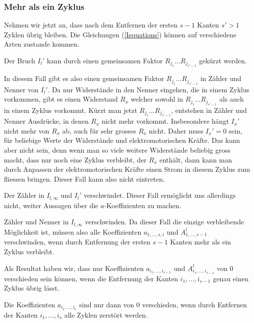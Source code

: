 \subsubsection{Mehr als ein Zyklus}
Nehmen wir jetzt an, dass nach dem Entfernen der ersten $s-1$ Kanten
$s'>1$ Zyklen übrig bleiben.
Die Gleichungen (\ref{Iequations}) können auf verschiedene Arten
zustande kommen.
\begin{compactenum}
\item Der Bruch $I_l'$ kann durch einen gemeinsamen Faktor
$R_{j_1}\dots R_{j_{s'-1}}$ gekürzt werden.

In diesem Fall gibt es also einen gemeinsamen Faktor
$R_{j_1}\dots R_{j_{s'-1}}$ in Zähler und Nenner von $I_l'$.
Da nur Widerstände in den Nenner
eingehen, die in einem Zyklus vorkommen, gibt es einen Widerstand
$R_x$ welcher sowohl in $R_{j_1}\dots R_{j_{s'-1}}$ als auch in
einem Zyklus vorkommt.
Kürzt man jetzt $R_{j_1}\dots R_{j_{s'-1}}$, entstehen in Zähler und
Nenner Ausdrücke, in denen $R_x$ nicht mehr vorkommt. 
Insbesondere hängt $I_x'$ nicht mehr von $R_x$ ab, auch für sehr grosses
$R_x$ nicht. Daher muss $I_x'=0$ sein, für beliebige Werte der Widerstände
und elektromotorischen Kräfte.
Das kann aber nicht sein, denn wenn man so viele weitere Widerstände 
beliebig gross macht, dass nur noch eine Zyklus verbleibt, der $R_x$
enthält, dann kann man durch Anpassen der elektromotorischen Kräfte
einen Strom in diesem Zyklus zum fliessen bringen. Dieser Fall kann
also nicht eintreten.
\item Der Zähler in $I_{l,\infty}$ und $I_l'$ verschwindet.
Dieser Fall ermöglicht uns allerdings nicht, weiter Aussagen
über die $a$-Koeffizienten zu machen.
\item Zähler und Nenner in $I_{l,\infty}$ verschwinden.
Da dieser Fall die einzige verbleibende Möglichkeit ist, müssen
also alle Koeffizienten $a_{1,\dots,s,i}$ und $A^l_{1,\dots,s-1}$
verschwinden, wenn durch Entfernung der ersten $s-1$ Kanten mehr als
ein Zyklus verbleibt.
\end{compactenum}
Als Resultat haben wir, dass nur Koeffizienten $a_{i_1,\dots,i_{s-1}}$
und $A_{i_1,\dots,i_{s-1}}^l$ von $0$ verschieden sein können, 
wenn die Entfernung der Kanten $i_1,\dots,i_{s-1}$ genau einen
Zyklus übrig lässt.

\begin{hilfssatz}
Die Koeffizienten $a_{i_1,\dots,i_s}$ sind nur dann von $0$ verschieden,
wenn durch Entfernen der Kanten $i_1,\dots,i_s$ alle Zyklen zerstört
werden.
\end{hilfssatz}

